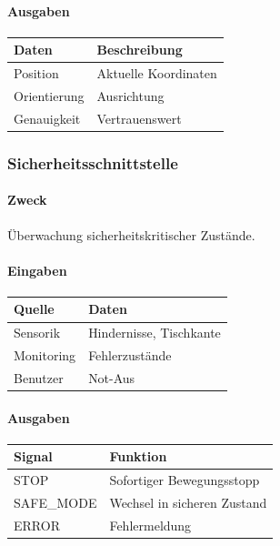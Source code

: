 \documentclass[
  a4paper,
  12pt,
  DIV=12,        %
  parskip=half,  %
  headings=small %
]{scrartcl}
\theoremstyle{definition}
\theoremstyle{definition}
\begin{document}
\paragraph{Ausgaben}\label{ausgaben-2}

\begin{longtable}[]{@{}ll@{}}
\toprule\noalign{}
Daten & Beschreibung \\
\midrule\noalign{}
\endhead
\bottomrule\noalign{}
\endlastfoot
Position & Aktuelle Koordinaten \\
Orientierung & Ausrichtung \\
Genauigkeit & Vertrauenswert \\
\end{longtable}

\subsubsection{Sicherheitsschnittstelle}\label{sicherheitsschnittstelle}

\paragraph{Zweck}\label{zweck-9}

Überwachung sicherheitskritischer Zustände.

\paragraph{Eingaben}\label{eingaben-3}

\begin{longtable}[]{@{}ll@{}}
\toprule\noalign{}
Quelle & Daten \\
\midrule\noalign{}
\endhead
\bottomrule\noalign{}
\endlastfoot
Sensorik & Hindernisse, Tischkante \\
Monitoring & Fehlerzustände \\
Benutzer & Not-Aus \\
\end{longtable}

\paragraph{Ausgaben}\label{ausgaben-3}

\begin{longtable}[]{@{}ll@{}}
\toprule\noalign{}
Signal & Funktion \\
\midrule\noalign{}
\endhead
\bottomrule\noalign{}
\endlastfoot
STOP & Sofortiger Bewegungsstopp \\
SAFE\_MODE & Wechsel in sicheren Zustand \\
ERROR & Fehlermeldung \\
\end{longtable}
\end{document}
